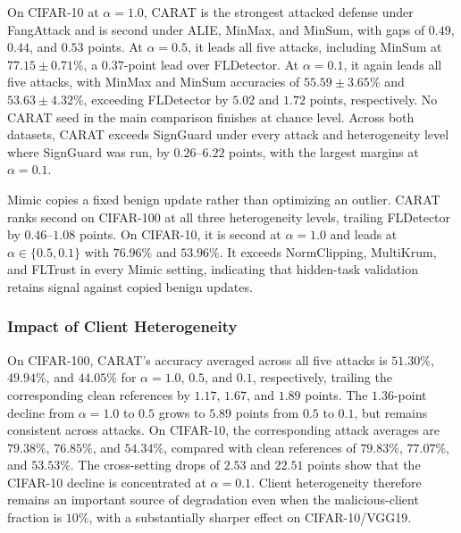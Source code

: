 On CIFAR-10 at $\alpha=1.0$, CARAT is the strongest attacked defense under FangAttack and is second under ALIE, MinMax, and MinSum, with gaps of $0.49$, $0.44$, and $0.53$ points. At $\alpha=0.5$, it leads all five attacks, including MinSum at $77.15\pm0.71\%$, a $0.37$-point lead over FLDetector. At $\alpha=0.1$, it again leads all five attacks, with MinMax and MinSum accuracies of $55.59\pm3.65\%$ and $53.63\pm4.32\%$, exceeding FLDetector by $5.02$ and $1.72$ points, respectively. No CARAT seed in the main comparison finishes at chance level. Across both datasets, CARAT exceeds SignGuard under every attack and heterogeneity level where SignGuard was run, by $0.26$--$6.22$ points, with the largest margins at $\alpha=0.1$.

Mimic copies a fixed benign update rather than optimizing an outlier. CARAT ranks second on CIFAR-100 at all three heterogeneity levels, trailing FLDetector by $0.46$--$1.08$ points. On CIFAR-10, it is second at $\alpha=1.0$ and leads at $\alpha\in\{0.5,0.1\}$ with $76.96\%$ and $53.96\%$. It exceeds NormClipping, MultiKrum, and FLTrust in every Mimic setting, indicating that hidden-task validation retains signal against copied benign updates.

\subsubsection{Impact of Client Heterogeneity}
On CIFAR-100, CARAT's accuracy averaged across all five attacks is $51.30\%$, $49.94\%$, and $44.05\%$ for $\alpha=1.0$, $0.5$, and $0.1$, respectively, trailing the corresponding clean references by $1.17$, $1.67$, and $1.89$ points. The $1.36$-point decline from $\alpha=1.0$ to $0.5$ grows to $5.89$ points from $0.5$ to $0.1$, but remains consistent across attacks. On CIFAR-10, the corresponding attack averages are $79.38\%$, $76.85\%$, and $54.34\%$, compared with clean references of $79.83\%$, $77.07\%$, and $53.53\%$. The cross-setting drops of $2.53$ and $22.51$ points show that the CIFAR-10 decline is concentrated at $\alpha=0.1$. Client heterogeneity therefore remains an important source of degradation even when the malicious-client fraction is $10\%$, with a substantially sharper effect on CIFAR-10/VGG19.

